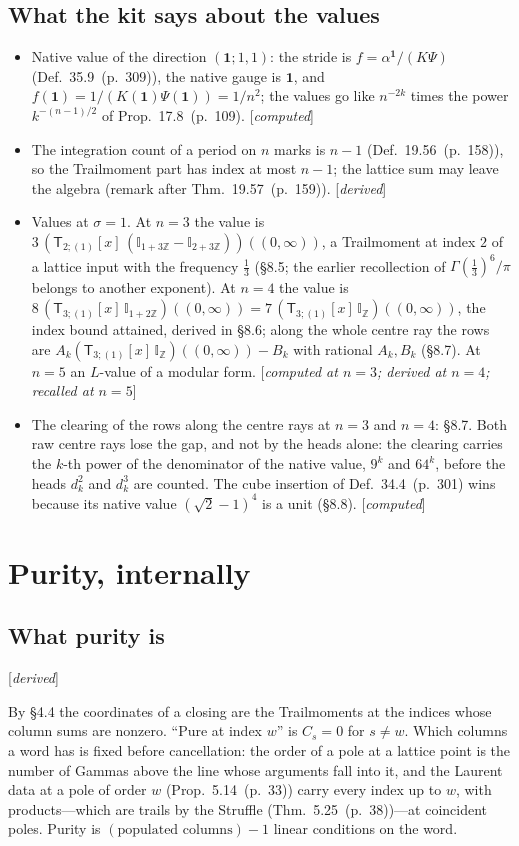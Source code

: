 \documentclass[11pt]{article}
\newcommand{\one}{\mathbf 1}
\newcommand{\sT}{\mathsf T}
\newcommand{\IZ}{\mathbb I_{\mathbb Z}}
\newcommand{\Ilat}[1]{\mathbb I_{#1}}
\newcommand{\Tx}[3]{(\sT_{#1;(1)}[x]\,#2)((#3,\infty))}
\newcommand{\status}[1]{\hfill{\small[\textit{#1}]}}
\newcommand{\hb}[2]{#1~(p.~#2)}   %
\theoremstyle{plain}
\theoremstyle{remark}
\begin{document}
\subsection{What the kit says about the values}

\begin{itemize}
\item Native value of the direction $(\one;1,1)$: the stride is $f=\alpha^{\one}/(K\Psi)$ (Def.~\hb{35.9}{309}), the native gauge is $\one$, and $f(\one)=1/(K(\one)\Psi(\one))=1/n^2$; the values go like $n^{-2k}$ times the power $k^{-(n-1)/2}$ of Prop.~\hb{17.8}{109}. \status{computed}
\item The integration count of a period on $n$ marks is $n-1$ (Def.~\hb{19.56}{158}), so the Trailmoment part has index at most $n-1$; the lattice sum may leave the algebra (remark after Thm.~\hb{19.57}{159}). \status{derived}
\item Values at $\sigma=1$. At $n=3$ the value is $3\,\Tx{2}{(\Ilat{1+3\mathbb Z}-\Ilat{2+3\mathbb Z})}{0}$, a Trailmoment at index $2$ of a lattice input with the frequency $\frac13$ (\S8.5; the earlier recollection of $\Gamma(\frac13)^6/\pi$ belongs to another exponent). At $n=4$ the value is $8\,\Tx{3}{\Ilat{1+2\mathbb Z}}{0}=7\,\Tx3{\IZ}0$, the index bound attained, derived in \S8.6; along the whole centre ray the rows are $A_k\Tx3{\IZ}0-B_k$ with rational $A_k,B_k$ (\S8.7). At $n=5$ an $L$-value of a modular form. \status{computed at $n=3$; derived at $n=4$; recalled at $n=5$}
\item The clearing of the rows along the centre rays at $n=3$ and $n=4$: \S8.7. Both raw centre rays lose the gap, and not by the heads alone: the clearing carries the $k$-th power of the denominator of the native value, $9^k$ and $64^k$, before the heads $d_k^2$ and $d_k^3$ are counted. The cube insertion of Def.~\hb{34.4}{301} wins because its native value $(\sqrt2-1)^4$ is a unit (\S8.8). \status{computed}
\end{itemize}

\section{Purity, internally}

\subsection{What purity is}\status{derived}

By \S4.4 the coordinates of a closing are the Trailmoments at the indices whose column sums are nonzero. ``Pure at index $w$'' is $C_s=0$ for $s\neq w$. Which columns a word has is fixed before cancellation: the order of a pole at a lattice point is the number of Gammas above the line whose arguments fall into it, and the Laurent data at a pole of order $w$ (Prop.~\hb{5.14}{33}) carry every index up to $w$, with products---which are trails by the Struffle (Thm.~\hb{5.25}{38})---at coincident poles. Purity is $(\text{populated columns})-1$ linear conditions on the word.
\end{document}
